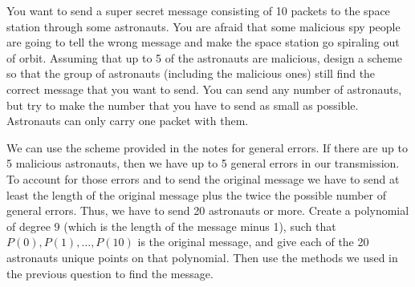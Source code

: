 \question You want to send a super secret message consisting of 10 
packets to the space station through some  astronauts. You are afraid 
that some malicious spy people are going to tell the wrong message and 
make the space station go spiraling out of orbit. Assuming that up to 
5 of the astronauts are malicious, design a scheme so that the group of 
astronauts (including the malicious ones) still find the correct message 
that you want to send. You can send any number of astronauts, but try to 
make the number that you have to send as small as possible. Astronauts 
can only carry one packet with them.
\begin{solution}[2 in]
We can use the scheme provided in the notes for general errors. If 
there are up to 5 malicious astronauts, then we have up to 5 general 
errors in our transmission. To account for those errors and to send 
the original message we have to send at least the length of the original 
message plus the twice the possible number of general errors. Thus, 
we have to send 20 astronauts or more. Create a polynomial of degree 
9 (which is the length of the message minus 1), such that $P(0), P(1), 
\dotsc, P(10)$ is the original message, and give each of the 20 
astronauts unique points on that polynomial. Then use the methods we 
used in the previous question to find the message.
\end{solution}
